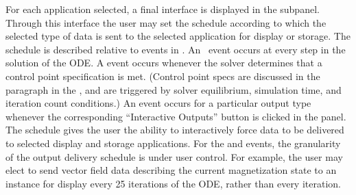 For each application selected, a final interface is displayed in the
 subpanel.  Through this interface
the user may set the schedule according to which the selected type of
data is sent to the selected application for display or storage.  The
schedule is described relative to events in .  An
~event occurs at every step in the solution of the ODE.
A  event occurs
whenever the solver determines that a control point specification is
met.  (Control point specs are discussed in the {} paragraph in the {}, and
are triggered by solver equilibrium, simulation time, and iteration
count conditions.)  An {} event occurs for a particular
output type whenever the corresponding ``Interactive Outputs'' button is
clicked in the {} panel.  The 
schedule gives the user the ability to interactively force data to be
delivered to selected display and storage applications.  For the
 and  events, the granularity of the
output delivery schedule is under user control.  For example, the user
may elect to send vector field data describing the current magnetization
state to an 
instance for display every 25 iterations of the ODE, rather than every
iteration.

